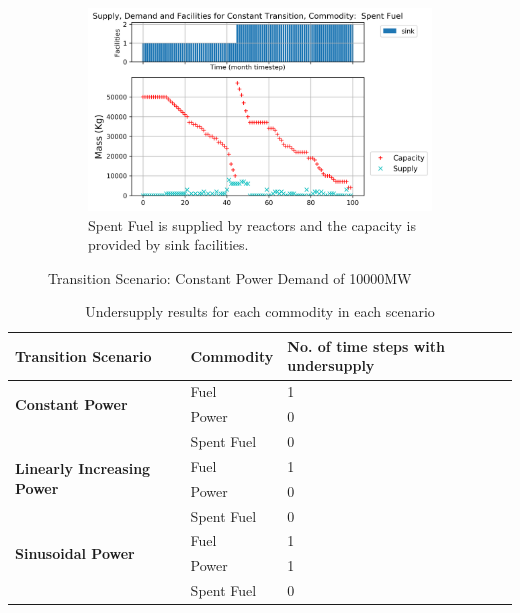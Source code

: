 \documentclass{anstrans}
\begin{document}
\begin{figure}[!htbp]
\begin{subfigure}[t]{0.65\textwidth}
	    \label{fig:constanttransition-fuel}
    \end{subfigure}
    \begin{subfigure}[t]{0.65\textwidth}
        \centering
        \includegraphics[width=\linewidth]{figures/constanttransition-spentfuel.png} 
        \caption{Spent Fuel is supplied by reactors and the capacity is provided by sink facilities.}
        \label{fig:constanttransition-spentfuel}
    \end{subfigure}
    \caption{Transition Scenario: Constant Power Demand of 10000MW}
\end{figure}

\begin{table}[htb]
    \centering
    \caption {Undersupply results for each commodity in each scenario}
	\label{tab:transition-scenario-results}
    \begin{tabular}{|l|l|p{4.5cm}|}
    \hline
    \textbf{Transition Scenario}    & \textbf{Commodity}    & \textbf{No. of time steps with undersupply} \\ \hline
    \multirow{2}{*}{\textbf{Constant Power}} & Fuel & 1 \\ \cline{2-3}
                                             & Power & 0 \\ \cline{2-3}
                                             & Spent Fuel & 0 \\ \hline
    \multirow{2}{*}{\textbf{Linearly Increasing Power}} & Fuel & 1 \\ \cline{2-3}
                                             & Power & 0 \\ \cline{2-3}
                                             & Spent Fuel & 0 \\ \hline
    \multirow{2}{*}{\textbf{Sinusoidal Power}} & Fuel & 1 \\ \cline{2-3}
                                             & Power & 1 \\ \cline{2-3}
                                             & Spent Fuel & 0 \\ \hline
    \end{tabular}
\end{table}
\end{document}
